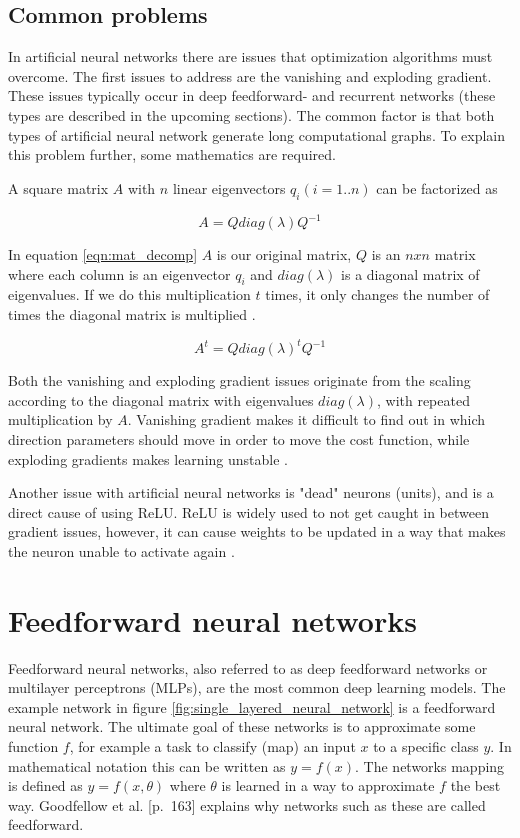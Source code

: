 \subsection{Common problems}
\label{vanishing-gradient}
\label{exploding-gradient}
\label{dead-neurons}
In artificial neural networks there are issues that optimization algorithms must overcome. The first issues to address are the vanishing and exploding gradient. These issues typically occur in deep feedforward- and recurrent networks (these types are described in the upcoming sections). The common factor is that both types of artificial neural network generate long computational graphs. To explain this problem further, some mathematics are required.

A square matrix $A$ with $n$ linear eigenvectors $q_i (i=1..n)$ can be factorized as

\begin{equation} \label{eqn:mat_decomp}
    A=Q diag(\lambda) Q^{-1} 
\end{equation}

In equation \ref{eqn:mat_decomp} $A$ is our original matrix, $Q$ is an $nxn$ matrix where each column is an eigenvector $q_i$ and $diag(\lambda)$ is a diagonal matrix of eigenvalues. If we do this multiplication $t$ times, it only changes the number of times the diagonal matrix is multiplied \cite{weisstein_eigen_????}.

\begin{equation} \label{eqn:mat_decomp_t}
    A^{t} = Q diag(\lambda)^{t} Q^{-1}
\end{equation}

Both the vanishing and exploding gradient issues originate from the scaling according to the diagonal matrix with eigenvalues $diag(\lambda)$, with repeated multiplication by $A$. Vanishing gradient makes it difficult to find out in which direction parameters should move in order to move the cost function, while exploding gradients makes learning unstable \cite{goodfellow_deep_2016}.

Another issue with artificial neural networks is "dead" neurons (units), and is a direct cause of using ReLU. ReLU is widely used to not get caught in between gradient issues, however, it can cause weights to be updated in a way that makes the neuron unable to activate again \cite{_cs231n_????}.

\section{Feedforward neural networks}
% 
Feedforward neural networks, also referred to as deep feedforward networks or multilayer perceptrons (MLPs), are the most common deep learning models. The example network in figure \ref{fig:single_layered_neural_network} is a feedforward neural network. The ultimate goal of these networks is to approximate some function $f$, for example a task to classify (map) an input $x$ to a specific class $y$. In mathematical notation this can be written as $y = f(x)$. The networks mapping is defined as $y = f(x,\theta)$ where $\theta$ is learned in a way to approximate $f$ the best way. Goodfellow et al. \cite{goodfellow_deep_2016}[p.~163] explains why networks such as these are called feedforward.


